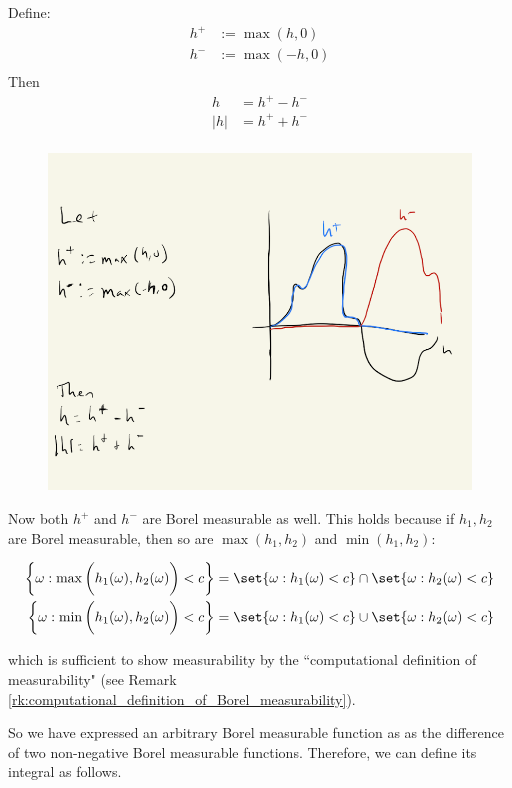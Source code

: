 \documentclass{article} %
\begin{document}
Define:
\begin{align*}
h^+ &:= \max (h,0) \\
h^- &:= \max (-h,0) \\	
\end{align*}
Then 
\begin{align*}
h &= h^+ - h^- \\
|h| &= h^+ + h^- \\	
\end{align*}

\begin{figure}[H]
\centering
\includegraphics[width=.7\textwidth]{images/arbitrary_borel_measurable_functions_in_terms_of_nonnegative_borel_measurable_functions}
\end{figure}

Now both $h^+$ and $h^-$ are Borel measurable as well.  This holds because if $h_1, h_2$ are Borel measurable, then so are $\max(h_1,h_2)$ and $\min(h_1,h_2)$:

\begin{align*}
\bigg\{ \omega : \max \bigg( h_1(\omega), h_2(\omega) \bigg) < c  \bigg\} &=	\set{\omega :  h_1(\omega) < c } \cap \set{\omega : h_2(\omega) < c } \\
\bigg\{ \omega : \min \bigg( h_1(\omega), h_2(\omega) \bigg)  < c \bigg\} &=	\set{\omega :  h_1(\omega) < c } \cup \set{\omega : h_2(\omega) < c }
\end{align*}


which is sufficient to show measurability by the ``computational definition of measurability" (see Remark \ref{rk:computational_definition_of_Borel_measurability}). 

So we have expressed an arbitrary Borel measurable function as as the difference of two non-negative Borel measurable functions. Therefore, we can define its integral as follows.  
\end{document}
